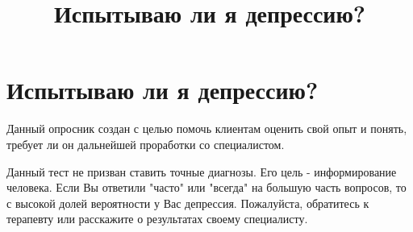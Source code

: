 \documentclass{survey}
\title{Испытываю ли я депрессию?}
\begin{document}
\section*{\huge{Испытываю ли я депрессию?}}

\begin{flushleft}
    Данный опросник создан с целью помочь клиентам оценить свой опыт и понять, требует ли он дальнейшей проработки со специалистом.
\end{flushleft}






\begin{flushleft}
    Данный тест не призван ставить точные диагнозы. Его цель - информирование человека. Если Вы ответили "часто" или "всегда" на большую часть вопросов, то с высокой долей вероятности у Вас депрессия. Пожалуйста, обратитесь к терапевту или расскажите о результатах своему специалисту.
\end{flushleft}
\end{document}
